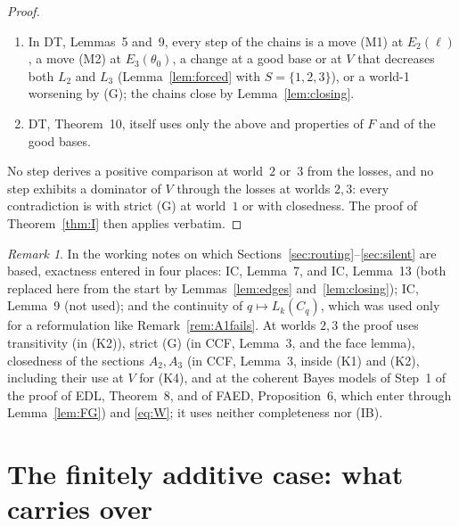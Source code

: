 \documentclass[11pt]{article}
\theoremstyle{definition}\newtheorem{definition}[theorem]{Definition}
\theoremstyle{remark}\newtheorem{remark}[theorem]{Remark}
\begin{document}
\begin{proof}
\begin{enumerate}[label=(\arabic*),leftmargin=*,itemsep=2pt]
\eqref{eq:W} gives $L_k(C_j)\le L_k(X_j)$. This is all that the proof uses: if
$s>b_j$ or $s<a_j$, then $L_2(B_s)>L_2(X_j)$, resp.\ $L_3(B_s)>L_3(X_j)$, so
$C_j\ne B_s$; if $a_j\le s\le b_j$, then $X_j\prec_1B_s$ by strict (G),
while $C_j\preceq_1X_j$, so again $C_j\ne B_s$. The limit step uses only the
continuity of ordinary losses along Hausdorff-convergent coherent models
(CBOI, Lemma~4), and DT, Lemma~1, is a statement about the densities, applied
to the coherent limit.
\item In DT, Lemmas~5 and~9, every step of the chains is a move (M1) at
$E_2(\ell)$, a move (M2) at $E_3(\theta_0)$, a change at a good base or at
$V$ that decreases both $L_2$ and $L_3$ (Lemma~\ref{lem:forced} with
$S=\{1,2,3\}$), or a world-1 worsening by (G); the chains close by
Lemma~\ref{lem:closing}.
\item DT, Theorem~10, itself uses only the above and properties of $F$ and of
the good bases.
\end{enumerate}
No step derives a positive comparison at world~$2$ or~$3$ from the losses,
and no step exhibits a dominator of $V$ through the losses at worlds $2,3$:
every contradiction is with strict (G) at world~$1$ or with closedness. The
proof of Theorem~\ref{thm:I} then applies verbatim.
\end{proof}

\begin{remark}\label{rem:exactness}
In the working notes on which Sections~\ref{sec:routing}--\ref{sec:silent}
are based, exactness entered in four places: IC, Lemma~7, and IC, Lemma~13
(both replaced here from the start by Lemmas~\ref{lem:edges}
and~\ref{lem:closing}); IC, Lemma~9 (not used); and the continuity of
$q\mapsto L_k(C_q)$, which was used only for a reformulation like
Remark~\ref{rem:A1fails}. At worlds $2,3$ the proof uses transitivity (in
(K2)), strict (G) (in CCF, Lemma~3, and the face lemma), closedness of the
sections $A_2,A_3$ (in CCF, Lemma~3, inside (K1) and (K2), including
their use at $V$ for (K4), and at the coherent Bayes models of Step~1 of the
proof of EDL, Theorem~8, and of FAED, Proposition~6, which enter through
Lemma~\ref{lem:FG}) and \eqref{eq:W}; it uses neither
completeness nor (IB).
\end{remark}

\section{The finitely additive case: what carries over}\label{sec:faclean}
\end{document}

